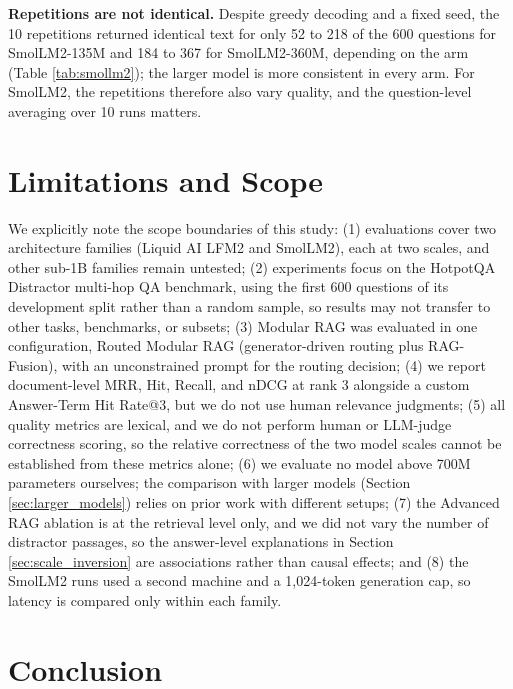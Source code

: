 \documentclass[10pt]{article}
\begin{document}
\textbf{Repetitions are not identical.} Despite greedy decoding and a fixed seed, the 10 repetitions returned identical text for only 52 to 218 of the 600 questions for SmolLM2-135M and 184 to 367 for SmolLM2-360M, depending on the arm (Table \ref{tab:smollm2}); the larger model is more consistent in every arm. For SmolLM2, the repetitions therefore also vary quality, and the question-level averaging over 10 runs matters.

\section{Limitations and Scope}
\label{sec:limitations}
We explicitly note the scope boundaries of this study: (1) evaluations cover two architecture families (Liquid AI LFM2 and SmolLM2), each at two scales, and other sub-1B families remain untested; (2) experiments focus on the HotpotQA Distractor multi-hop QA benchmark, using the first 600 questions of its development split rather than a random sample, so results may not transfer to other tasks, benchmarks, or subsets; (3) Modular RAG was evaluated in one configuration, Routed Modular RAG (generator-driven routing plus RAG-Fusion), with an unconstrained prompt for the routing decision; (4) we report document-level MRR, Hit, Recall, and nDCG at rank 3 alongside a custom Answer-Term Hit Rate@3, but we do not use human relevance judgments; (5) all quality metrics are lexical, and we do not perform human or LLM-judge correctness scoring, so the relative correctness of the two model scales cannot be established from these metrics alone; (6) we evaluate no model above 700M parameters ourselves; the comparison with larger models (Section \ref{sec:larger_models}) relies on prior work with different setups; (7) the Advanced RAG ablation is at the retrieval level only, and we did not vary the number of distractor passages, so the answer-level explanations in Section \ref{sec:scale_inversion} are associations rather than causal effects; and (8) the SmolLM2 runs used a second machine and a 1,024-token generation cap, so latency is compared only within each family.

\section{Conclusion}
\label{sec:conclusion}
\end{document}
